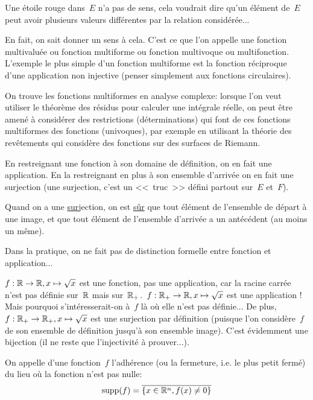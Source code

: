Une étoile rouge dans~$E$ n'a pas de sens, cela voudrait dire qu'un élément de~$E$
peut avoir plusieurs valeurs différentes par la relation considérée...

 En fait, on sait donner un sens à cela. C'est ce que l'on appelle une
fonction multivaluée ou fonction multiforme ou fonction multivoque ou multifonction.
L'exemple le plus simple d'un fonction multiforme est la fonction réciproque d'une application
non injective (penser simplement aux fonctions circulaires).

On trouve les fonctions multiformes en analyse complexe: lorsque l'on veut utiliser le théorème des résidus
pour calculer une intégrale réelle, on peut être amené à considérer des restrictions (déterminations)
qui font de ces fonctions multiformes des fonctions (univoques), par exemple en utilisant la théorie des
revêtements qui considère des fonctions sur des surfaces de Riemann.

\medskip
En restreignant une fonction à son domaine de définition, on en fait une application.
En la restreignant en plus à son ensemble d'arrivée on en fait une surjection
(une surjection, c'est un <<~truc~>> défini partout sur~$E$ et~$F$).

Quand on a une \underline{sur}jection, on est \underline{sûr} que tout élément
de l'ensemble de départ à une image, et que tout élément de l'ensemble
d'arrivée a un antécédent (au moins un même).

Dans la pratique, on ne fait pas de distinction formelle entre fonction et application...

$f: \mathbb R\to\mathbb R, x\mapsto\sqrt{x}$ est une fonction, pas une application, car la racine carrée
n'est pas définie sur~$\mathbb R$ mais sur~$\mathbb R_+$.~$f: \mathbb R_+\to\mathbb R, x\mapsto\sqrt{x}$
est une application ! Mais pourquoi s'intéresserait-on à~$f$ là où elle n'est
pas définie... De plus, $f: \mathbb R_+\to\mathbb R_+, x\mapsto\sqrt{x}$ est une surjection
par définition (puisque l'on considère~$f$ de son ensemble de définition jusqu'à
son ensemble image). C'est évidemment une bijection (il ne reste que l'injectivité
à prouver...).

\medskip
\begin{definition}[Support]
On appelle  d'une fonction~$f$ l'adhérence (ou la fermeture,
i.e. le plus petit fermé) du lieu où la fonction n'est pas nulle:
\begin{equation}\operatorname{supp}(f)=\overline{\{x\in\mathbb R^n, f(x)\ne0\}}\end{equation}
\end{definition}

